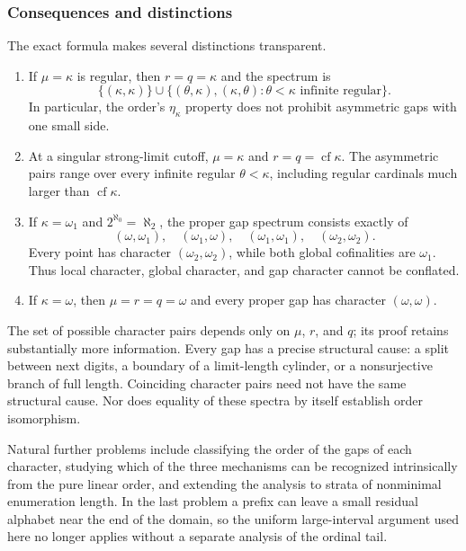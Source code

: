 \documentclass[11pt]{article}
\theoremstyle{definition}
\theoremstyle{remark}
\begin{document}
\subsubsection{Consequences and distinctions}

The exact formula makes several distinctions transparent.
\begin{enumerate}
\item If $\mu=\kappa$ is regular, then $r=q=\kappa$ and the
 spectrum is
 \[
 \{(\kappa,\kappa)\}\cup
 \{(\theta,\kappa),(\kappa,\theta):
          \theta<\kappa\text{ infinite regular}\}.
 \]
 In particular, the order's $\eta_\kappa$ property does not prohibit
 asymmetric gaps with one small side.
\item At a singular strong-limit cutoff, $\mu=\kappa$ and
 $r=q=\operatorname{cf}\kappa$.  The asymmetric pairs range
 over every infinite regular $\theta<\kappa$, including regular
 cardinals much larger than $\operatorname{cf}\kappa$.
\item If $\kappa=\omega_1$ and $2^{\aleph_0}=\aleph_2$, the proper
 gap spectrum consists exactly of
 \[
 (\omega,\omega_1),\quad(\omega_1,\omega),\quad
 (\omega_1,\omega_1),\quad(\omega_2,\omega_2).
 \]
 Every point has character $(\omega_2,\omega_2)$, while both global
 cofinalities are $\omega_1$.  Thus local character, global character,
 and gap character cannot be conflated.
\item If $\kappa=\omega$, then $\mu=r=q=\omega$ and every
 proper gap has character $(\omega,\omega)$.
\end{enumerate}

The set of possible character pairs depends only on $\mu$, $r$,
and $q$; its proof retains substantially more information.
Every gap has a precise structural cause: a split between next
digits, a boundary of a limit-length cylinder, or a nonsurjective
branch of full length.  Coinciding character pairs need not have
the same structural cause.  Nor does equality of these spectra by
itself establish order isomorphism.

Natural further problems include classifying the order of the gaps
of each character, studying which of the three mechanisms can be
recognized intrinsically from the pure linear order, and extending
the analysis to strata of nonminimal enumeration length.  In the
last problem a prefix can leave a small residual alphabet near the
end of the domain, so the uniform large-interval argument used here
no longer applies without a separate analysis of the ordinal tail.
\end{document}
